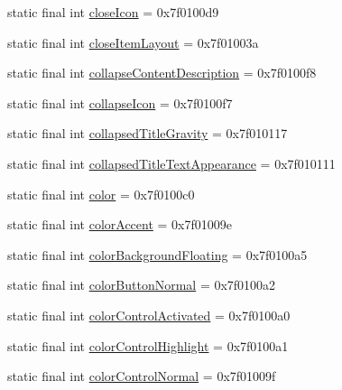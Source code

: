 \begin{CompactItemize}
\item 
static final int \hyperlink{classandroid_1_1support_1_1v7_1_1palette_1_1_r_1_1attr_d9ac744185002bedc4104a2a4ae7468a}{closeIcon} = 0x7f0100d9
\item 
static final int \hyperlink{classandroid_1_1support_1_1v7_1_1palette_1_1_r_1_1attr_58eda3e05eda1b6ab9a4d92fe81a4fba}{closeItemLayout} = 0x7f01003a
\item 
static final int \hyperlink{classandroid_1_1support_1_1v7_1_1palette_1_1_r_1_1attr_d8afbd45a21248b36d1ed40e17f2fe56}{collapseContentDescription} = 0x7f0100f8
\item 
static final int \hyperlink{classandroid_1_1support_1_1v7_1_1palette_1_1_r_1_1attr_8174c7ecd1260402b697d0bc3be69708}{collapseIcon} = 0x7f0100f7
\item 
static final int \hyperlink{classandroid_1_1support_1_1v7_1_1palette_1_1_r_1_1attr_63d943cd27e760c67497b5cf6c19fdd1}{collapsedTitleGravity} = 0x7f010117
\item 
static final int \hyperlink{classandroid_1_1support_1_1v7_1_1palette_1_1_r_1_1attr_87ca850601212addb49a8687968b500a}{collapsedTitleTextAppearance} = 0x7f010111
\item 
static final int \hyperlink{classandroid_1_1support_1_1v7_1_1palette_1_1_r_1_1attr_b32c1c3b98b896568213e075d4fe6653}{color} = 0x7f0100c0
\item 
static final int \hyperlink{classandroid_1_1support_1_1v7_1_1palette_1_1_r_1_1attr_8ba2b317471a08b044ace0d8015ab5fc}{colorAccent} = 0x7f01009e
\item 
static final int \hyperlink{classandroid_1_1support_1_1v7_1_1palette_1_1_r_1_1attr_37487e1f8fb0990c9c69081e88d5882c}{colorBackgroundFloating} = 0x7f0100a5
\item 
static final int \hyperlink{classandroid_1_1support_1_1v7_1_1palette_1_1_r_1_1attr_a2693254c5ed55a77816cec6d8aa7ecd}{colorButtonNormal} = 0x7f0100a2
\item 
static final int \hyperlink{classandroid_1_1support_1_1v7_1_1palette_1_1_r_1_1attr_31dd391d58e197dddd77cdf95e64eb9b}{colorControlActivated} = 0x7f0100a0
\item 
static final int \hyperlink{classandroid_1_1support_1_1v7_1_1palette_1_1_r_1_1attr_49ef792e4bf017d2be51143a08b86248}{colorControlHighlight} = 0x7f0100a1
\item 
static final int \hyperlink{classandroid_1_1support_1_1v7_1_1palette_1_1_r_1_1attr_35dffafb36462db4ee22e954f434aed5}{colorControlNormal} = 0x7f01009f
\item 

\end{CompactItemize}
